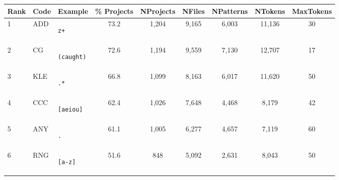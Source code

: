 \begin{table*}
\begin{center}
\begin{footnotesize}
\caption{Frequency of feature appearance in Projects, Files and Patterns, with number of tokens observed and the maximum number of tokens observed in a single pattern.}
\label{table:featureStatsOnly}
\begin{tabular}
{lllcccc  cc}
\textbf{Rank} & \textbf{Code} & \textbf{Example} & \% \textbf{Projects} & \textbf{NProjects} & \textbf{NFiles} & \textbf{NPatterns} & \textbf{NTokens} & \textbf{MaxTokens} \\
\toprule[0.12em]
1 & ADD & \begin{minipage}{0.5in}\begin{verbatim}z+\end{verbatim}\end{minipage} & 73.2 & 1,204 & 9,165 & 6,003 & 11,136 & 30 \\
\midrule
2 & CG & \begin{minipage}{0.5in}\begin{verbatim}(caught)\end{verbatim}\end{minipage} & 72.6 & 1,194 & 9,559 & 7,130 & 12,707 & 17 \\
\midrule
3 & KLE & \begin{minipage}{0.5in}\begin{verbatim}.*\end{verbatim}\end{minipage} & 66.8 & 1,099 & 8,163 & 6,017 & 11,620 & 50 \\
\midrule
4 & CCC & \begin{minipage}{0.5in}\begin{verbatim}[aeiou]\end{verbatim}\end{minipage} & 62.4 & 1,026 & 7,648 & 4,468 & 8,179 & 42 \\
\midrule
5 & ANY & \begin{minipage}{0.5in}\begin{verbatim}.\end{verbatim}\end{minipage} & 61.1 & 1,005 & 6,277 & 4,657 & 7,119 & 60 \\
\midrule
6 & RNG & \begin{minipage}{0.5in}\begin{verbatim}[a-z]\end{verbatim}\end{minipage} & 51.6 & 848 & 5,092 & 2,631 & 8,043 & 50 \\

\end{tabular}
\end{footnotesize}
\end{center}
\end{table*}
